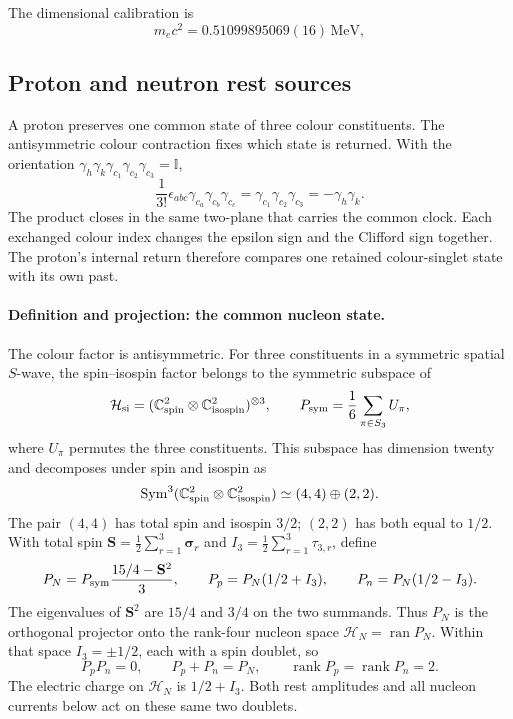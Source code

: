 \documentclass[aps,prx,onecolumn,10pt,notitlepage,nofootinbib,longbibliography]{revtex4-2}
\numberwithin{equation}{section}
\numberwithin{table}{section}
\newcommand{\Id}{\mathbb I}
\newcommand{\CC}{\mathbb C}
\newcommand{\rank}{\operatorname{rank}}
\newcommand{\MeV}{\,\mathrm{MeV}}
\begin{document}
The dimensional calibration is
\begin{equation}
 m_ec^2=0.51099895069(16)\MeV,
 \label{eq:meunit}
\end{equation}

\subsection{Proton and neutron rest sources}
A proton preserves one common state of three colour constituents. The antisymmetric colour contraction fixes which state is returned. With the orientation $\gamma_h\gamma_k\gamma_{c_1}\gamma_{c_2}\gamma_{c_3}=\Id$,
\begin{equation}
 \frac1{3!}\epsilon_{abc}\gamma_{c_a}\gamma_{c_b}\gamma_{c_c}
 =\gamma_{c_1}\gamma_{c_2}\gamma_{c_3}
 =-\gamma_h\gamma_k.
 \label{eq:colourclosure}
\end{equation}
The product closes in the same two-plane that carries the common clock. Each exchanged colour index changes the epsilon sign and the Clifford sign together. The proton's internal return therefore compares one retained colour-singlet state with its own past.

\paragraph*{Definition and projection: the common nucleon state.}
The colour factor is antisymmetric. For three constituents in a symmetric spatial $S$-wave, the spin--isospin factor belongs to the symmetric subspace of
\begin{equation}
 \mathcal H_{\rm si}
 =(\CC^2_{\rm spin}\otimes\CC^2_{\rm isospin})^{\otimes3},
 \qquad
 P_{\rm sym}=\frac1{6}\sum_{\pi\in S_3}U_\pi,
 \label{eq:nucleonsymmetrizer}
\end{equation}
where $U_\pi$ permutes the three constituents. This subspace has dimension twenty and decomposes under spin and isospin as
\begin{equation}
 \operatorname{Sym}^3(\CC^2_{\rm spin}\otimes\CC^2_{\rm isospin})
 \simeq(4,4)\oplus(2,2).
 \label{eq:nucleondecomposition}
\end{equation}
The pair $(4,4)$ has total spin and isospin $3/2$; $(2,2)$ has both equal to $1/2$. With total spin $\mathbf S=\tfrac12\sum_{r=1}^3\boldsymbol\sigma_r$ and $I_3=\tfrac12\sum_{r=1}^3\tau_{3,r}$, define
\begin{equation}
 P_N=P_{\rm sym}\frac{15/4-\mathbf S^2}{3},\qquad
 P_p=P_N(1/2+I_3),\qquad P_n=P_N(1/2-I_3).
 \label{eq:nucleonprojectors}
\end{equation}
The eigenvalues of $\mathbf S^2$ are $15/4$ and $3/4$ on the two summands. Thus $P_N$ is the orthogonal projector onto the rank-four nucleon space $\mathcal H_N=\operatorname{ran}P_N$. Within that space $I_3=\pm1/2$, each with a spin doublet, so
\begin{equation}
 P_pP_n=0,\qquad P_p+P_n=P_N,\qquad
 \rank P_p=\rank P_n=2.
 \label{eq:nucleonprojectorranks}
\end{equation}
The electric charge on $\mathcal H_N$ is $1/2+I_3$. Both rest amplitudes and all nucleon currents below act on these same two doublets.
\end{document}
